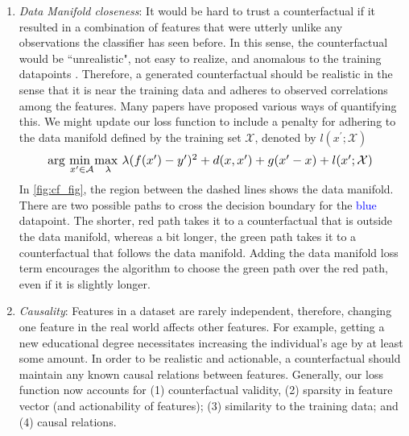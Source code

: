 \begin{enumerate}[leftmargin=*]
    \item \textit{Data Manifold closeness}: It would be hard to trust a counterfactual if it resulted in a combination of features that were utterly unlike any observations the classifier has seen before. In this sense, the counterfactual would be ``unrealistic", not easy to realize, and anomalous to the training datapoints \citep{Brown_Talbert_cfe-anomalous}. Therefore, a generated counterfactual should be realistic in the sense that it is near the training data and adheres to observed correlations among the features. Many papers have proposed various ways of quantifying this. We might update our loss function to include a penalty for adhering to the data manifold defined by the training set $\mathcal{X}$, denoted by $l(x^{\prime} ; \mathcal{X})$
    \begin{equation}
        \resizebox{.85\columnwidth}{!}{$ {\mathrm{arg \ }}\underset{x^{\prime }\in \mathcal{A}}{\mathrm{min \ }}\underset{\lambda}{\mathrm{max \ }} \lambda(f(x^{\prime}) - y^{\prime})^2 + d(x, x^{\prime}) + g(x^{\prime} - x) + l(x^{\prime} ; \mathcal{X}) $ }
        \label{eq:cfe4}
    \end{equation}
    In \cref{fig:cf_fig}, the region between the dashed lines shows the data manifold. There are two possible paths to cross the decision boundary for the \textcolor{blue}{blue} datapoint. The shorter, red path takes it to a counterfactual that is outside the data manifold, whereas a bit longer, the green path takes it to a counterfactual that follows the data manifold. Adding the data manifold loss term encourages the algorithm to choose the green path over the red path, even if it is slightly longer. 
    
    \item \textit{Causality}: Features in a dataset are rarely independent, therefore, changing one feature in the real world affects other features. For example, getting a new educational degree necessitates increasing the individual's age by at least some amount. In order to be realistic and actionable, a counterfactual should maintain any known causal relations between features. 
    Generally, our loss function now accounts for (1) counterfactual validity, (2) sparsity in feature vector (and actionability of features); (3) similarity to the training data; and (4) causal relations. 
    \end{enumerate}
    
